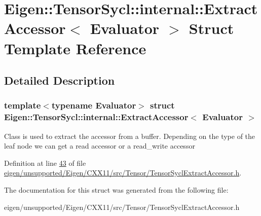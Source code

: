 \hypertarget{struct_eigen_1_1_tensor_sycl_1_1internal_1_1_extract_accessor}{}\section{Eigen\+:\+:Tensor\+Sycl\+:\+:internal\+:\+:Extract\+Accessor$<$ Evaluator $>$ Struct Template Reference}
\label{struct_eigen_1_1_tensor_sycl_1_1internal_1_1_extract_accessor}


\subsection{Detailed Description}
\subsubsection*{template$<$typename Evaluator$>$\newline
struct Eigen\+::\+Tensor\+Sycl\+::internal\+::\+Extract\+Accessor$<$ Evaluator $>$}

Class is used to extract the accessor from a buffer. Depending on the type of the leaf node we can get a read accessor or a read\+\_\+write accessor 

Definition at line \hyperlink{eigen_2unsupported_2_eigen_2_c_x_x11_2src_2_tensor_2_tensor_sycl_extract_accessor_8h_source_l00043}{43} of file \hyperlink{eigen_2unsupported_2_eigen_2_c_x_x11_2src_2_tensor_2_tensor_sycl_extract_accessor_8h_source}{eigen/unsupported/\+Eigen/\+C\+X\+X11/src/\+Tensor/\+Tensor\+Sycl\+Extract\+Accessor.\+h}.



The documentation for this struct was generated from the following file\+:\begin{DoxyCompactItemize}
\item 
eigen/unsupported/\+Eigen/\+C\+X\+X11/src/\+Tensor/\+Tensor\+Sycl\+Extract\+Accessor.\+h\end{DoxyCompactItemize}

